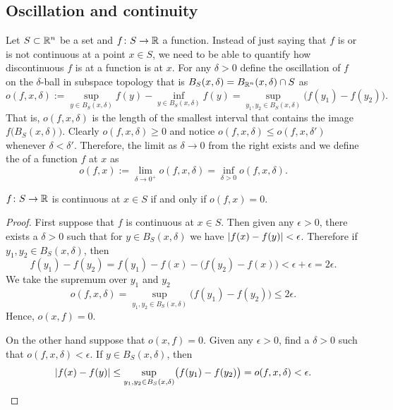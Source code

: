 \subsection{Oscillation and continuity}

Let $S \subset {\mathbb{R}}^n$ be a set and $f \colon S \to {\mathbb{R}}$ a function.
Instead of just saying that $f$ is or is not continuous at
a point $x \in S$,
we need to be able to quantify how discontinuous $f$ is at a function is
at $x$.  For any $\delta > 0$ define the oscillation of 
$f$ on the $\delta$-ball in subspace topology that is
$B_S(x,\delta) = B_{{\mathbb{R}}^n}(x,\delta) \cap S$ as
\begin{equation*}
o(f,x,\delta) :=
{\sup_{y \in B_S(x,\delta)} f(y)}
-
{\inf_{y \in B_S(x,\delta)} f(y)}
= 
\sup_{y_1,y_2 \in B_S(x,\delta)} \bigl(f(y_1)-f(y_2)\bigr) .
\end{equation*}
That is, $o(f,x,\delta)$ is the length of the smallest interval
that contains the image $f\bigl(B_S(x,\delta)\bigr)$.
Clearly $o(f,x,\delta) \geq 0$ and
notice $o(f,x,\delta) \leq o(f,x,\delta')$ whenever $\delta < \delta'$.
Therefore, the limit as $\delta \to 0$ from the right exists and
we define the \emph{} of a function $f$
at $x$ as
\begin{equation*}
o(f,x) :=
\lim_{\delta \to 0^+}
o(f,x,\delta) =
\inf_{\delta > 0}
o(f,x,\delta) .
\end{equation*}

\begin{prop}
$f \colon S \to {\mathbb{R}}$ is continuous at $x \in S$ if and only if $o(f,x) = 0$.
\end{prop}

\begin{proof}
First suppose that $f$ is continuous at $x \in S$.  Then given any $\epsilon > 0$,
there exists a $\delta > 0$ such that for $y \in B_S(x,\delta)$
we have $\lvert {f(x)-f(y)} \rvert < \epsilon$.  Therefore if $y_1,y_2 \in
B_S(x,\delta)$, then
\begin{equation*}
f(y_1)-f(y_2) =
f(y_1)-f(x)-\bigl(f(y_2)-f(x)\bigr) < \epsilon + \epsilon = 2 \epsilon .
\end{equation*}
We take the supremum over $y_1$ and $y_2$
\begin{equation*}
o(f,x,\delta) = 
\sup_{y_1,y_2 \in B_S(x,\delta)} \bigl(f(y_1)-f(y_2)\bigr)
\leq
2 \epsilon .
\end{equation*}
Hence, $o(x,f) = 0$.

On the other hand suppose that $o(x,f) = 0$.  Given any $\epsilon > 0$,
find a $\delta > 0$ such that $o(f,x,\delta) < \epsilon$.  If
$y \in B_S(x,\delta)$, then
\begin{equation*}
\lvert {f(x)-f(y)} \rvert
\leq
\sup_{y_1,y_2 \in B_S(x,\delta)} \bigl(f(y_1)-f(y_2)\bigr)
=
o(f,x,\delta) < \epsilon. \qedhere
\end{equation*}
\end{proof}

